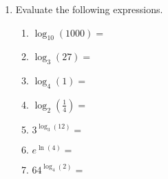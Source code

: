 \begin{enumerate}
\item Evaluate the following expressions.
\begin{enumerate}
\item $\log_{10}(1000)=$
\vfill
\item $\log_3(27)=$
\vfill
\item $\log_4(1)=$
\vfill
\item $\displaystyle \log_2(\frac{1}{4})=$
\vfill
\item $3^{\log_3(12)}=$
\vfill
\item $e^{\ln(4)}=$
\vfill
\item $64^{\log_4(2)}=$
\vfill

\end{enumerate}















  


\end{enumerate}

